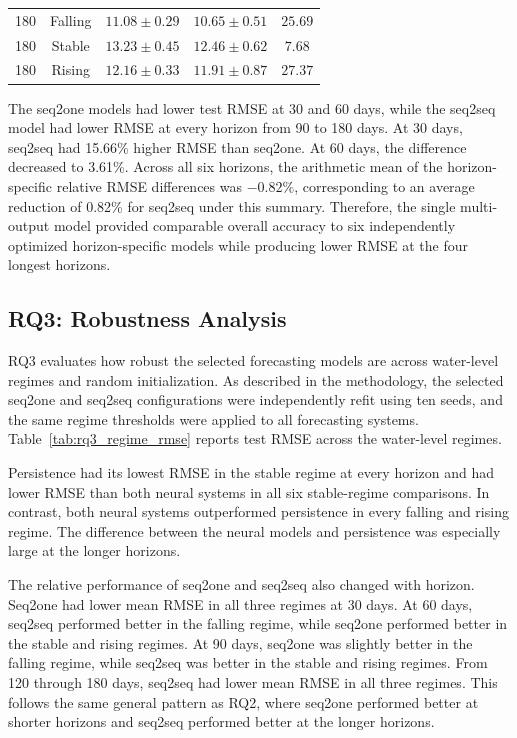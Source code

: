 \documentclass[conference]{IEEEtran}
\begin{document}
\begin{table}[!t]
\begin{tabular}{@{}ccccc@{}}
        180 & Falling & $11.08 \pm 0.29$ & $\mathbf{10.65 \pm 0.51}$ & $25.69$ \\
        180 & Stable  & $13.23 \pm 0.45$ & $\mathbf{12.46 \pm 0.62}$ & $7.68$ \\
        180 & Rising  & $12.16 \pm 0.33$ & $\mathbf{11.91 \pm 0.87}$ & $27.37$ \\
        \hline
    \end{tabular}
\end{table}

The seq2one models had lower test RMSE at 30 and 60 days, while the seq2seq model had lower RMSE at every horizon from 90 to 180 days. At 30 days, seq2seq had 15.66\% higher RMSE than seq2one. At 60 days, the difference decreased to 3.61\%. Across all six horizons, the arithmetic mean of the horizon-specific relative RMSE differences was $-0.82\%$, corresponding to an average reduction of 0.82\% for seq2seq under this summary. Therefore, the single multi-output model provided comparable overall accuracy to six independently optimized horizon-specific models while producing lower RMSE at the four longest horizons.

\subsection{RQ3: Robustness Analysis}

RQ3 evaluates how robust the selected forecasting models are across water-level regimes and random initialization. As described in the methodology, the selected seq2one and seq2seq configurations were independently refit using ten seeds, and the same regime thresholds were applied to all forecasting systems. Table~\ref{tab:rq3_regime_rmse} reports test RMSE across the water-level regimes.

Persistence had its lowest RMSE in the stable regime at every horizon and had lower RMSE than both neural systems in all six stable-regime comparisons. In contrast, both neural systems outperformed persistence in every falling and rising regime. The difference between the neural models and persistence was especially large at the longer horizons.

The relative performance of seq2one and seq2seq also changed with horizon. Seq2one had lower mean RMSE in all three regimes at 30 days. At 60 days, seq2seq performed better in the falling regime, while seq2one performed better in the stable and rising regimes. At 90 days, seq2one was slightly better in the falling regime, while seq2seq was better in the stable and rising regimes. From 120 through 180 days, seq2seq had lower mean RMSE in all three regimes. This follows the same general pattern as RQ2, where seq2one performed better at shorter horizons and seq2seq performed better at the longer horizons.
\end{document}
